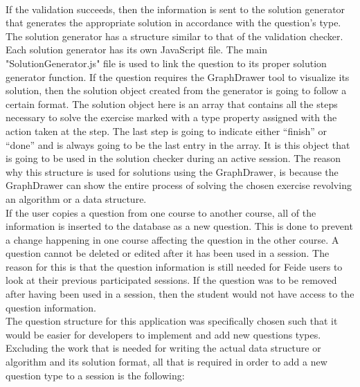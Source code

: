 \\[11pt]
If the validation succeeds, then the information is sent to the solution generator that generates the appropriate solution in accordance with the question's type. The solution generator has a structure similar to that of the validation checker. Each solution generator has its own JavaScript file. The main "SolutionGenerator.js" file is used to link the question to its proper solution generator function. If the question requires the GraphDrawer tool to visualize its solution, then the solution object created from the generator is going to follow a certain format. The solution object here is an array that contains all the steps necessary to solve the exercise marked with a type property assigned with the action taken at the step. The last step is going to indicate either “finish” or “done” and is always going to be the last entry in the array. It is this object that is going to be used in the solution checker during an active session. The reason why this structure is used for solutions using the GraphDrawer, is because the GraphDrawer can show the entire process of solving the chosen exercise revolving an algorithm or a data structure.
\\[11pt]
If the user copies a question from one course to another course, all of the information is inserted to the database as a new question. This is done to prevent a change happening in one course affecting the question in the other course. A question cannot be deleted or edited after it has been used in a session. The reason for this is that the question information is still needed for Feide users to look at their previous participated sessions. If the question was to be removed after having been used in a session, then the student would not have access to the question information.
\\[11pt]
The question structure for this application was specifically chosen such that it would be easier for developers to implement and add new questions types. Excluding the work that is needed for writing the actual data structure or algorithm and its solution format, all that is required in order to add a new question type to a session is the following:
